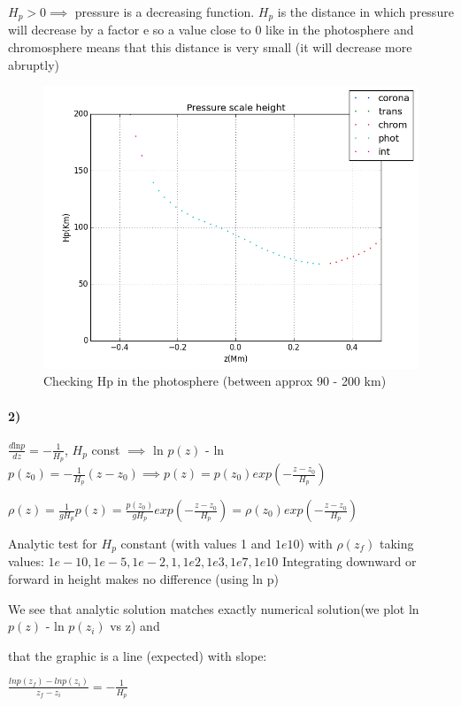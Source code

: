 \documentclass[10pt]{book}
\begin{document}
$H_p > 0 \implies $ pressure is a decreasing function. $H_p$ is the distance in which pressure will decrease by a factor e so a value close to 0 like in the photosphere and chromosphere means that this distance is very small (it will decrease more abruptly)

\begin{figure}[H]
 \centering
 \includegraphics[scale=0.5]{hpLayersPart.png}
 \caption{Checking Hp in the photosphere (between approx 90 - 200 km)}
\end{figure}

\paragraph{2)}

$\frac{d \text{ln} p}{dz} = -\frac{1}{H_p}$, $H_p$ const $\implies$ ln $p(z)$ - ln $ p(z_0) = -\frac{1}{H_p}(z-z_0) \implies p(z) = p(z_0) exp(-\frac{z-z_0}{H_p})$  

$\rho(z) =  \frac{1}{g H_p}p(z) = \frac{p(z_0)}{g H_p} exp(-\frac{z-z_0}{H_p}) = \rho(z_0) exp(-\frac{z-z_0}{H_p})$ 

Analytic test for $H_p$ constant (with values 1 and $1e10$) with $\rho(z_f)$ taking values: $1e-10, 1e-5, 1e-2,1, 1e2,1e3, 1e7, 1e10$
Integrating downward or forward in height makes no difference (using ln p)

We see that analytic solution matches exactly numerical solution(we plot ln $p(z)$ - ln $ p(z_i)$ vs z) and 

that the graphic is a line (expected) with slope:
 
$\frac{ln p(z_f) - ln  p(z_i)}{z_f - z_i} = -\frac{1}{H_p} $
\end{document}
